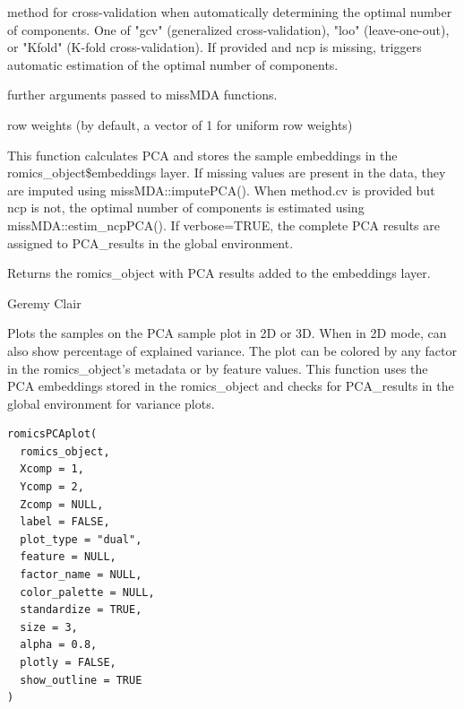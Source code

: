 \documentclass[a4paper]{book}
\begin{document}
\begin{Arguments}
\begin{ldescription}
\item[\code{method.cv}] method for cross-validation when automatically determining the optimal number of components.
One of "gcv" (generalized cross-validation), "loo" (leave-one-out), or "Kfold" (K-fold cross-validation).
If provided and ncp is missing, triggers automatic estimation of the optimal number of components.

\item[\code{...}] further arguments passed to missMDA functions.

\item[\code{row.w}] row weights (by default, a vector of 1 for uniform row weights)
\end{ldescription}
\end{Arguments}
%
\begin{Details}
This function calculates PCA and stores the sample embeddings in the romics\_object\$embeddings layer.
If missing values are present in the data, they are imputed using missMDA::imputePCA().
When method.cv is provided but ncp is not, the optimal number of components is estimated using missMDA::estim\_ncpPCA().
If verbose=TRUE, the complete PCA results are assigned to PCA\_results in the global environment.
\end{Details}
%
\begin{Value}
Returns the romics\_object with PCA results added to the embeddings layer.
\end{Value}
%
\begin{Author}
Geremy Clair
\end{Author}
%
\begin{Description}
Plots the samples on the PCA sample plot in 2D or 3D. When in 2D mode, can also show percentage of explained variance.
The plot can be colored by any factor in the romics\_object's metadata or by feature values.
This function uses the PCA embeddings stored in the romics\_object and checks for PCA\_results in the global environment for variance plots.
\end{Description}
%
\begin{Usage}
\begin{verbatim}
romicsPCAplot(
  romics_object,
  Xcomp = 1,
  Ycomp = 2,
  Zcomp = NULL,
  label = FALSE,
  plot_type = "dual",
  feature = NULL,
  factor_name = NULL,
  color_palette = NULL,
  standardize = TRUE,
  size = 3,
  alpha = 0.8,
  plotly = FALSE,
  show_outline = TRUE
)
\end{verbatim}
\end{Usage}
\end{document}
